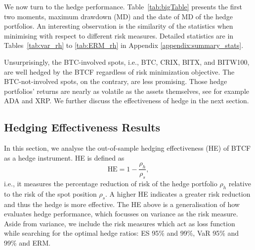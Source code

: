 \documentclass[11pt,a4paper,english]{article}
\begin{document}
\afterpage{
  \begin{landscape}
  
\end{landscape}
}

We now turn to the hedge performance. 
Table~\ref{tab:bigTable}
presents the first two moments, maximum drawdown (MD) and the date of
MD of the hedge portfolios. An interesting observation is the similarity of
the statistics when minimising with respect to different risk measures.
Detailed statistics are in Tables~\ref{tab:var_rh} to \ref{tab:ERM_rh} in Appendix
\ref{appendix:summary_stats}. 
 
Unsurprisingly, the BTC-involved spots, i.e., BTC, CRIX, BITX, and
BITW100, are well hedged by the BTCF regardless of risk minimization
objective. 
The BTC-not-involved spots, on the contrary, are less promising. Those
hedge portfolios' returns are nearly as volatile as the
assets themselves, see for example ADA and XRP. 
We further discuss the effectiveness of hedge in the next
section. %

\subsection{Hedging Effectiveness Results}\label{sec: HE results}
In this section, we analyse the out-of-sample hedging effectiveness
(HE) of BTCF as a hedge instrument. 
HE is defined as $$\text{HE} = 1-\frac{\rho_h}{\rho_s},$$
i.e., it measures the percentage reduction of risk of the hedge
portfolio $\rho_h $ relative to the risk of the spot position $\rho_s$.
A higher HE indicates a greater risk reduction and thus the hedge is
more effective.  
The HE above is a generalisation of how \citet{ederington1979hedging}
evaluates hedge performance, which focusses on variance as the risk
measure. 
Aside from variance, we include the risk measures which act as
loss function while searching for the optimal hedge ratios: ES 95\%
and 99\%, VaR 95\% and 99\% and ERM.
\end{document}
